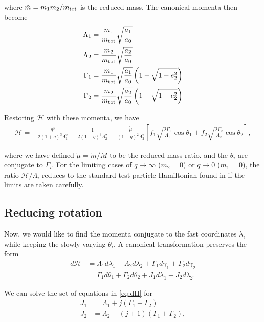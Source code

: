 \documentclass[usenatbib,onecolumn]{mnras}
\begin{document}
\noindent
where \(\tilde m = m_1m_2/m_{\rm tot}\) is the reduced mass.
The canonical momenta then become
\begin{align}
  \Lambda_1 &= \frac{m_1}{m_{\rm tot}}\sqrt{\frac{a_1}{a_0}} \\
  \Lambda_2 &= \frac{m_2}{m_{\rm tot}}\sqrt{\frac{a_2}{a_0}} \\
  \Gamma_1 &= \frac{m_1}{m_{\rm tot}}\sqrt{\frac{a_1}{a_0}}
             \left(1-\sqrt{1-e_2^2}\right) \\
  \Gamma_2 &= \frac{m_2}{m_{\rm tot}}\sqrt{\frac{a_2}{a_0}}
             \left(1-\sqrt{1-e_2^2}\right)
\end{align}

\noindent
Restoring \(\mathcal{H}\) with these momenta, we have
\begin{align}
\label{eq:H_1}
  \mathcal{H}
  = -\frac{q^3}{2(1+q)^3 \Lambda_1^2}
    - \frac{1}{2(1+q)^3\Lambda_2^2}
   - \frac{\tilde\mu}{(1+q)^2 \Lambda_2^2}\left[
    f_1\sqrt{\frac{2\Gamma_1}{\Lambda_1}}\cos\theta_1
    +f_2\sqrt{\frac{2\Gamma_2}{\Lambda_2}}\cos\theta_2
    \right],
\end{align}

\noindent where we have defined \(\tilde\mu=\tilde m/M\) to be
the reduced mass ratio.  and the \(\theta_i\) are conjugate to
\(\Gamma_i\).  For the limiting cases of \(q\to \infty\) (\(m_2=0\)) or
\(q\to 0\) (\(m_1=0\)), the ratio \(\mathcal{H}/\Lambda_i\) reduces to the
standard test particle Hamiltonian found in \citet{murray_solar_2000} if
the limits are taken carefully.
\subsection{Reducing rotation}
\label{sec:org5888ae9}
Now, we would like to find the momenta conjugate to the fast
coordinates \(\lambda_i\) while keeping the slowly varying \(\theta_i\).
A canonical transformation preserves the form
\begin{align}
  \label{eq:dH} 
  d\mathcal{H}
  &= \Lambda_1 d\lambda_1+\Lambda_2d\lambda_2
    + \Gamma_1d\gamma_1+\Gamma_2d\gamma_2\nonumber\\
  &= \Gamma_1 d\theta_1 + \Gamma_2 d\theta_2
    +J_1 d\lambda_1+J_2d\lambda_2 .
\end{align}

\noindent
We can solve the set of equations in \eqref{eq:dH} for
\begin{align}
\label{eq:J1}
J_1 &= \Lambda_1 + j(\Gamma_1+\Gamma_2)\\
\label{eq:J2}
J_2 &= \Lambda_2 - (j+1)(\Gamma_1+\Gamma_2),
\end{align}
\end{document}
